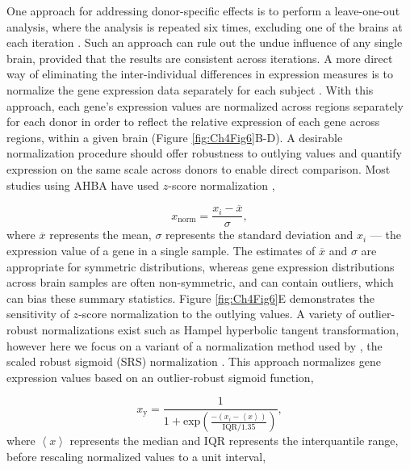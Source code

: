 \documentclass[10pt,A4]{article}
\begin{document}
One approach for addressing donor-specific effects is to perform a leave-one-out analysis, where the analysis is repeated six times, excluding one of the brains at each iteration  \citep{Parkes2017,McColgan2018}. Such an approach can rule out the undue influence of any single brain, provided that the results are consistent across iterations. A more direct way of eliminating the inter-individual differences in expression measures is to normalize the gene expression data separately for each subject \citep{Richiardi2015,Whitaker2016a,Vertes2016b,Rizzo2016,Liu2017,Negi2017,Burt2018,McColgan2018,Romero-Garcia2018a}. With this approach, each gene’s expression values are normalized across regions separately for each donor in order to reflect the relative expression of each gene across regions, within a given brain (Figure \ref{fig:Ch4Fig6}B-D). A desirable normalization procedure should offer robustness to outlying values and quantify expression on the same scale across donors to enable direct comparison. Most studies using AHBA have used $z$-score normalization \citep{Rizzo2016,Whitaker2016a,Vertes2016b,Negi2017,Romero-Garcia2018a},

\begin{equation}
    \label{eqn:eq1}
    x_\mathrm{norm} = \frac{x_\mathrm{\textit{i}}-\overline{x}}{\sigma},
\end{equation}
where $\overline{x}$ represents the mean, $\sigma$ represents the standard deviation and $x_\mathrm{\textit{i}}$ --- the expression value of a gene in a single sample. The estimates of $\overline{x}$ and $\sigma$ are appropriate for symmetric distributions, whereas gene expression distributions across brain samples are often non-symmetric, and can contain outliers, which can bias these summary statistics. Figure \ref{fig:Ch4Fig6}E demonstrates the sensitivity of $z$-score normalization to the outlying values.
A variety of outlier-robust normalizations exist such as Hampel hyperbolic tangent transformation, however here we focus on a variant of a normalization method used by \citet{Fulcher2016}, the scaled robust sigmoid (SRS) normalization \citep{Fulcher2013}. This approach normalizes gene expression values based on an outlier-robust sigmoid function,

\begin{equation}
    \label{eqn:eq2}
    x_\mathrm{y} = \frac{1}{1+\mathrm{exp}({\frac{-(x_\mathrm{\textit{i}}-\left\langle x \right\rangle)}{\mathrm{IQR}/1.35}})},
\end{equation}
where $\left\langle x \right\rangle$ represents the median and $\mathrm{IQR}$ represents the interquantile range, before rescaling normalized values to a unit interval,
\end{document}
